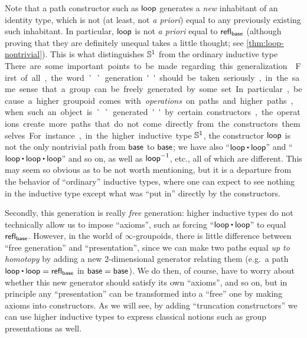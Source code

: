 Note that a path constructor such as $\mathsf{loop}$ generates a \emph{new} inhabitant of an identity type, which is not (at least, not \emph{a priori}) equal to any previously existing such inhabitant.
In particular, $\mathsf{loop}$ is not \emph{a priori} equal to $\mathsf{refl}_{\mathsf{base}}$ (although proving that they are definitely unequal takes a little thought; see \cref{thm:loop-nontrivial}).
This is what distinguishes $\mathbb{S}^1$ from the ordinary inductive type \unit.

There are some important points to be made regarding this generalization.

%
First of all, the word ``generation'' should be taken seriously, in the same sense that a group can be freely generated by some set.
In particular, because a higher groupoid comes with \emph{operations} on paths and higher paths, when such an object is ``generated'' by certain constructors, the operations create more paths that do not come directly from the constructors themselves.
For instance, in the higher inductive type $\mathbb{S}^1$, the constructor $\mathsf{loop}$ is not the only nontrivial path from $\mathsf{base}$ to $\mathsf{base}$; we have also ``$\lloop\ct\lloop$'' and ``$\lloop\ct\lloop\ct\lloop$'' and so on, as well as $\mathord{{\mathsf{loop}}^{-1}}$, etc., all of which are different.
This may seem so obvious as to be not worth mentioning, but it is a departure from the behavior of ``ordinary'' inductive types, where one can expect to see nothing in the inductive type except what was ``put in'' directly by the constructors.

Secondly, this generation is really \emph{free} generation: higher inductive types do not technically allow us to impose ``axioms'', such as forcing ``$\lloop\ct\lloop$'' to equal $\mathsf{refl}_{\mathsf{base}}$.
However, in the world of $\infty$-groupoids,%
there is little difference between ``free generation'' and ``presentation'',
%
%
since we can make two paths equal \emph{up to homotopy} by adding a new 2-di\-men\-sion\-al generator relating them (e.g.\ a path $\lloop\ct\lloop = \refl{\base}$ in $\mathsf{base}=\mathsf{base}$).
We do then, of course, have to worry about whether this new generator should satisfy its own ``axioms'', and so on, but in principle any ``presentation'' can be transformed into a ``free'' one by making axioms into constructors.
As we will see, by adding ``truncation constructors'' we can use higher inductive types to express classical notions such as group presentations as well.


